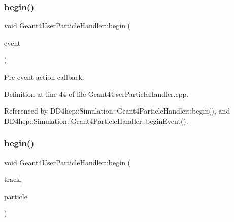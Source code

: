 \subsubsection{\texorpdfstring{begin()}{begin()}\hspace{0.1cm}{\footnotesize\ttfamily [1/2]}}
{\footnotesize\ttfamily void Geant4\+User\+Particle\+Handler\+::begin (\begin{DoxyParamCaption}\item[{const G4\+Event $\ast$}]{event }\end{DoxyParamCaption})\hspace{0.3cm}{\ttfamily [virtual]}}



Pre-\/event action callback. 



Definition at line 44 of file Geant4\+User\+Particle\+Handler.\+cpp.



Referenced by D\+D4hep\+::\+Simulation\+::\+Geant4\+Particle\+Handler\+::begin(), and D\+D4hep\+::\+Simulation\+::\+Geant4\+Particle\+Handler\+::begin\+Event().

\hypertarget{class_d_d4hep_1_1_simulation_1_1_geant4_user_particle_handler_a1a26c0a3a16679a1378cfcdfbc5800e2}{}\label{class_d_d4hep_1_1_simulation_1_1_geant4_user_particle_handler_a1a26c0a3a16679a1378cfcdfbc5800e2} 
\subsubsection{\texorpdfstring{begin()}{begin()}\hspace{0.1cm}{\footnotesize\ttfamily [2/2]}}
{\footnotesize\ttfamily void Geant4\+User\+Particle\+Handler\+::begin (\begin{DoxyParamCaption}\item[{const G4\+Track $\ast$}]{track,  }\item[{\hyperlink{class_d_d4hep_1_1_simulation_1_1_geant4_user_particle_handler_a0222f326d539ff27c6c446a7a30e8e26}{Particle} \&}]{particle }\end{DoxyParamCaption})\hspace{0.3cm}{\ttfamily [virtual]}}



